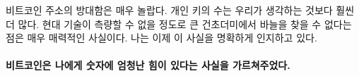 \begin{comment}
The vastness of Bitcoin's address space is truly mind-boggling. The
number of private keys even more so. It is fascinating how much of our
modern world boils down to the improbability of finding a needle in an
unfathomably large haystack. I am now more aware of this fact than ever.
\end{comment}
비트코인 주소의 방대함은 매우 놀랍다. 개인 키의 수는 우리가 생각하는 것보다 훨씬 더 많다.
현대 기술이 측량할 수 없을 정도로 큰 건초더미에서 바늘을 찾을 수 없다는 점은 매우 매력적인 사실이다.
나는 이제 이 사실을 명확하게 인지하고 있다.

\paragraph{비트코인은 나에게 숫자에 엄청난 힘이 있다는 사실을 가르쳐주었다.}


%
%
%
%
